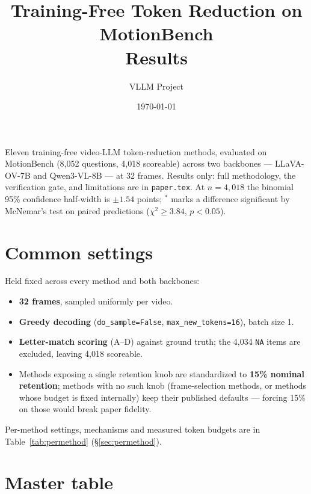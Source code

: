 \documentclass[11pt]{article}
\title{Training-Free Token Reduction on MotionBench\\
\large Results}
\author{VLLM Project}
\date{\today}
\begin{document}
\maketitle

\noindent Eleven training-free video-LLM token-reduction methods, evaluated
on MotionBench (8{,}052 questions, 4{,}018 scoreable) across two backbones
--- LLaVA-OV-7B and Qwen3-VL-8B --- at 32 frames. Results only: full
methodology, the verification gate, and limitations are in \texttt{paper.tex}.
At $n=4{,}018$ the binomial 95\% confidence half-width is $\pm1.54$ points;
$^{*}$ marks a difference significant by McNemar's test on paired predictions
($\chi^2\geq3.84$, $p<0.05$).

\tableofcontents

\section{Common settings}
\label{sec:settings}

Held fixed across every method and both backbones:

\begin{itemize}
  \setlength\itemsep{0.15em}
  \item \textbf{32 frames}, sampled uniformly per video.
  \item \textbf{Greedy decoding} (\texttt{do\_sample=False}, \texttt{max\_new\_tokens=16}), batch size 1.
  \item \textbf{Letter-match scoring} (A--D) against ground truth; the 4{,}034 \texttt{NA} items are excluded, leaving 4{,}018 scoreable.
  \item Methods exposing a single retention knob are standardized to \textbf{15\% nominal retention}; methods with no such knob (frame-selection methods, or methods whose budget is fixed internally) keep their published defaults --- forcing 15\% on those would break paper fidelity.
\end{itemize}

Per-method settings, mechanisms and measured token budgets are in
Table~\ref{tab:permethod} (\S\ref{sec:permethod}).

\section{Master table}
\label{sec:master}
\end{document}
